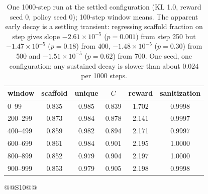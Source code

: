 \documentclass[10pt,letterpaper]{article}
\begin{document}
\begin{table}[!htbp]\centering
\caption{One 1000-step run at the settled configuration (KL 1.0, reward seed 0, policy seed 0); 100-step window means. The apparent early decay is a settling transient: regressing scaffold fraction on step gives slope $-2.61\times10^{-5}$ ($p=0.001$) from step 250 but $-1.47\times10^{-5}$ ($p=0.18$) from 400, $-1.48\times10^{-5}$ ($p=0.30$) from 500 and $-1.51\times10^{-5}$ ($p=0.62$) from 700. One seed, one configuration; any sustained decay is slower than about $0.024$ per 1000 steps.}
\label{tab:s9}
\begin{tabular}{@{}lccccc@{}}\toprule
window & scaffold & unique & $C$ & reward & sanitization\\\midrule
0--99 & 0.835 & 0.985 & 0.839 & 1.702 & 0.9998\\
200--299 & 0.873 & 0.984 & 0.878 & 2.141 & 0.9997\\
400--499 & 0.859 & 0.982 & 0.894 & 2.171 & 0.9997\\
600--699 & 0.861 & 0.984 & 0.901 & 2.195 & 1.0000\\
800--899 & 0.852 & 0.979 & 0.904 & 2.197 & 1.0000\\
900--999 & 0.853 & 0.979 & 0.905 & 2.198 & 0.9998\\\bottomrule
\end{tabular}
\end{table}

\begin{table}[!htbp]\centering\small
\caption{Settled generator configuration, read from \texttt{results/brics\_cgate/pseed0/config.json}. The reward weights are annealed linearly over \texttt{k\_anneal} steps from $(D,C,Q,S)=(1.0,0.2,0.5,0.5)$ to $(0.3,1.5,0.5,0.5)$; with \texttt{drop=['C']} the $C$ term is replaced by the gate \texttt{min\_c}.}
\label{tab:s10}
@@S10@@
\end{table}

\FloatBarrier
\end{document}
